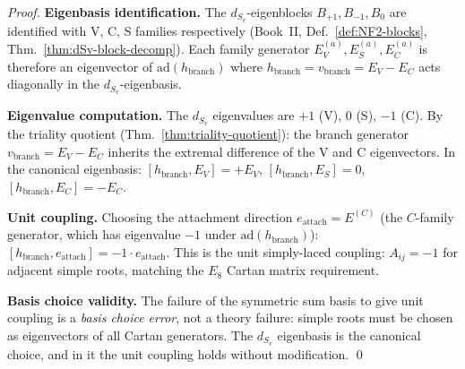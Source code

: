 \documentclass[12pt,oneside]{amsbook}
\theoremstyle{plain}
\theoremstyle{definition}
\theoremstyle{remark}
\begin{document}
\begin{proof}
\textbf{Eigenbasis identification.}
The $d_{S_v}$-eigenblocks $B_{+1}, B_{-1}, B_0$ are identified with
V, C, S families respectively
(Book~II, Def.~\ref{def:NF2-blocks}, Thm.~\ref{thm:dSv-block-decomp}).
Each family generator $E_V^{(a)}, E_S^{(a)}, E_C^{(a)}$ is therefore
an eigenvector of $\mathrm{ad}(h_{\mathrm{branch}})$ where
$h_{\mathrm{branch}} = v_{\mathrm{branch}} = E_V - E_C$ acts
diagonally in the $d_{S_v}$-eigenbasis.

\textbf{Eigenvalue computation.}
The $d_{S_v}$ eigenvalues are $+1$ (V), $0$ (S), $-1$ (C).
By the triality quotient (Thm.~\ref{thm:triality-quotient}): the
branch generator $v_{\mathrm{branch}} = E_V - E_C$ inherits the
extremal difference of the V and C eigenvectors. In the canonical
eigenbasis: $[h_{\mathrm{branch}}, E_V] = +E_V$,
$[h_{\mathrm{branch}}, E_S] = 0$,
$[h_{\mathrm{branch}}, E_C] = -E_C$.

\textbf{Unit coupling.}
Choosing the attachment direction $e_{\mathrm{attach}} = E^{(C)}$
(the $C$-family generator, which has eigenvalue $-1$ under
$\mathrm{ad}(h_{\mathrm{branch}})$):
$[h_{\mathrm{branch}}, e_{\mathrm{attach}}] = -1 \cdot e_{\mathrm{attach}}$.
This is the unit simply-laced coupling: $A_{ij} = -1$ for adjacent
simple roots, matching the $E_8$ Cartan matrix requirement.

\textbf{Basis choice validity.}
The failure of the symmetric sum basis to give unit coupling is a
\emph{basis choice error}, not a theory failure: simple roots must be
chosen as eigenvectors of all Cartan generators. The $d_{S_v}$
eigenbasis is the canonical choice, and in it the unit coupling holds
without modification. \qed
\end{proof}
\end{document}
